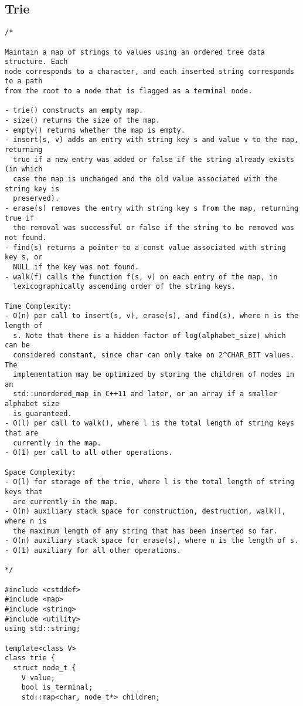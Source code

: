 \subsection{Trie}
\begin{lstlisting}
/*

Maintain a map of strings to values using an ordered tree data structure. Each
node corresponds to a character, and each inserted string corresponds to a path
from the root to a node that is flagged as a terminal node.

- trie() constructs an empty map.
- size() returns the size of the map.
- empty() returns whether the map is empty.
- insert(s, v) adds an entry with string key s and value v to the map, returning
  true if a new entry was added or false if the string already exists (in which
  case the map is unchanged and the old value associated with the string key is
  preserved).
- erase(s) removes the entry with string key s from the map, returning true if
  the removal was successful or false if the string to be removed was not found.
- find(s) returns a pointer to a const value associated with string key s, or
  NULL if the key was not found.
- walk(f) calls the function f(s, v) on each entry of the map, in
  lexicographically ascending order of the string keys.

Time Complexity:
- O(n) per call to insert(s, v), erase(s), and find(s), where n is the length of
  s. Note that there is a hidden factor of log(alphabet_size) which can be
  considered constant, since char can only take on 2^CHAR_BIT values. The
  implementation may be optimized by storing the children of nodes in an
  std::unordered_map in C++11 and later, or an array if a smaller alphabet size
  is guaranteed.
- O(l) per call to walk(), where l is the total length of string keys that are
  currently in the map.
- O(1) per call to all other operations.

Space Complexity:
- O(l) for storage of the trie, where l is the total length of string keys that
  are currently in the map.
- O(n) auxiliary stack space for construction, destruction, walk(), where n is
  the maximum length of any string that has been inserted so far.
- O(n) auxiliary stack space for erase(s), where n is the length of s.
- O(1) auxiliary for all other operations.

*/

#include <cstddef>
#include <map>
#include <string>
#include <utility>
using std::string;

template<class V>
class trie {
  struct node_t {
    V value;
    bool is_terminal;
    std::map<char, node_t*> children;


\end{lstlisting}
